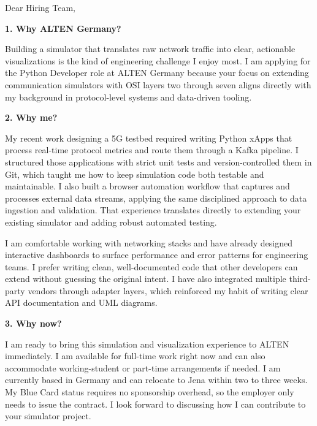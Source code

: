 \documentclass[11pt,a4paper]{coverletter}
\begin{document}

\opening{Dear Hiring Team,}

\vspace{8pt}\noindent\textbf{1. Why ALTEN Germany?}\par\vspace{3pt}

Building a simulator that translates raw network traffic into clear, actionable visualizations is the kind of engineering challenge I enjoy most. I am applying for the Python Developer role at ALTEN Germany because your focus on extending communication simulators with OSI layers two through seven aligns directly with my background in protocol-level systems and data-driven tooling.

\vspace{8pt}\noindent\textbf{2. Why me?}\par\vspace{3pt}

My recent work designing a 5G testbed required writing Python xApps that process real-time protocol metrics and route them through a Kafka pipeline. I structured those applications with strict unit tests and version-controlled them in Git, which taught me how to keep simulation code both testable and maintainable. I also built a browser automation workflow that captures and processes external data streams, applying the same disciplined approach to data ingestion and validation. That experience translates directly to extending your existing simulator and adding robust automated testing.

I am comfortable working with networking stacks and have already designed interactive dashboards to surface performance and error patterns for engineering teams. I prefer writing clean, well-documented code that other developers can extend without guessing the original intent. I have also integrated multiple third-party vendors through adapter layers, which reinforced my habit of writing clear API documentation and UML diagrams.

\vspace{8pt}\noindent\textbf{3. Why now?}\par\vspace{3pt}

I am ready to bring this simulation and visualization experience to ALTEN immediately. I am available for full-time work right now and can also accommodate working-student or part-time arrangements if needed. I am currently based in Germany and can relocate to Jena within two to three weeks. My Blue Card status requires no sponsorship overhead, so the employer only needs to issue the contract. I look forward to discussing how I can contribute to your simulator project.
\end{document}
